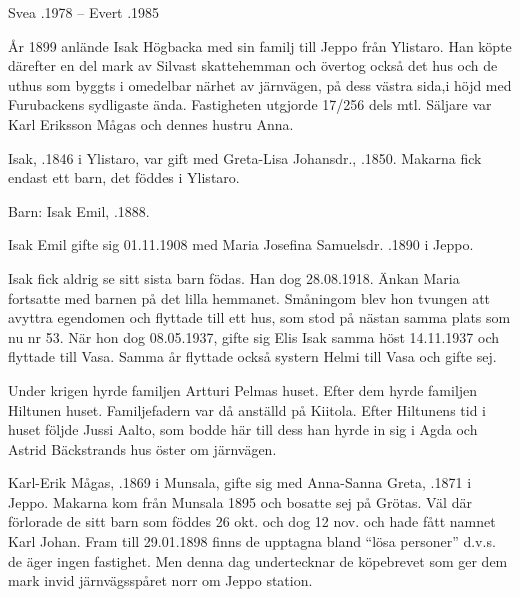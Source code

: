 Svea .1978  --  Evert .1985






År 1899 anlände Isak Högbacka med sin familj till Jeppo från Ylistaro. Han köpte därefter en del mark av Silvast skattehemman och övertog också det hus och de uthus som byggts i omedelbar närhet av järnvägen, på dess västra sida,i höjd med Furubackens sydligaste ända. Fastigheten utgjorde 17/256 dels mtl. Säljare var  Karl Eriksson Mågas och dennes hustru Anna.

Isak,  .1846 i Ylistaro, var gift med Greta-Lisa Johansdr., .1850. Makarna fick endast ett barn, det föddes i Ylistaro.

Barn: Isak Emil, .1888.

Isak Emil gifte sig 01.11.1908 med Maria Josefina Samuelsdr. .1890 i Jeppo.
\begin{jhchildren}
  \item {}
  \item {}
  \item {}
  \item {}
\end{jhchildren}

Isak fick aldrig se sitt sista barn födas. Han dog 28.08.1918. Änkan Maria fortsatte med barnen på det lilla hemmanet. Småningom blev hon tvungen att avyttra egendomen och flyttade till ett hus, som stod på nästan samma plats som nu nr 53. När hon dog 08.05.1937, gifte sig Elis Isak samma höst 14.11.1937 och flyttade till Vasa. Samma år flyttade också systern Helmi till Vasa och gifte sej.

Under krigen hyrde familjen Artturi Pelmas huset. Efter dem hyrde familjen Hiltunen huset. Familjefadern var då anställd på Kiitola. Efter Hiltunens tid i huset följde Jussi Aalto, som bodde här till dess han hyrde in sig i Agda och Astrid Bäckstrands hus öster om järnvägen.



Karl-Erik Mågas, .1869 i Munsala, gifte sig med Anna-Sanna Greta, .1871 i Jeppo. Makarna kom från Munsala 1895 och bosatte sej på Grötas. Väl där förlorade de sitt barn som föddes 26 okt. och dog 12 nov. och hade fått namnet Karl Johan. Fram till 29.01.1898 finns de upptagna bland ``lösa personer'' d.v.s. de äger ingen fastighet. Men denna dag undertecknar de köpebrevet som ger dem mark invid järnvägsspåret norr om Jeppo station.

